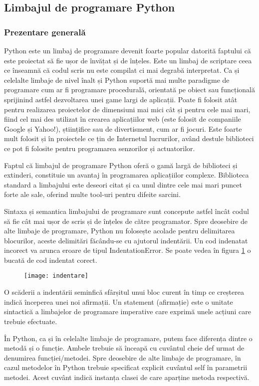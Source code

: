 \documentclass[../IoMusT.tex]{subfiles}
\begin{document}
\subsection{Limbajul de programare Python}
\subsubsection{Prezentare generală}
Python este un limbaj de programare devenit foarte popular datorită faptului că este proiectat să fie ușor de învățat și de înțeles. Este un limbaj de scriptare ceea ce înseamnă că codul scris nu este compilat ci mai degrabă interpretat. Ca și celelalte limbaje de nivel înalt și Python suportă mai multe paradigme de programare cum ar fi programare procedurală, orientată pe obiect sau funcțională sprijinind astfel dezvoltarea unei game largi de aplicații. Poate fi folosit atât pentru realizarea proiectelor de dimensiuni mai mici cât și pentru cele mai mari, fiind cel mai des utilizat în crearea aplicațiilor web (este folosit de companiile Google și Yahoo!), științifice sau de divertisment, cum ar fi jocuri. Este foarte mult folosit și în proiectele ce țin de Internetul lucrurilor, având destule biblioteci ce pot fi folosite pentru programarea senzorilor și actuatorilor.
\\
\par Faptul că limbajul de programare Python oferă o gamă largă de biblioteci și extinderi, constituie un avantaj în programarea aplicațiilor complexe. Biblioteca standard a limbajului este deseori citat și ca unul dintre cele mai mari puncet forte ale sale, oferind multe tool-uri pentru difeite sarcini.
\\
\par Sintaxa și semantica limbajului de programare sunt concepute astfel încât codul să fie cât mai ușor de scris și de înțeles de către programator. Spre deosebire de alte limbaje de programare, Python nu folosește acolade pentru delimitarea blocurilor, aceste delimitări făcându-se cu ajutorul indentării. Un cod indenatat incorect va arunca eroare de tipul IndentationError. Se poate vedea în figura \ref{fig:indent} o bucată de cod indentat corect.
\begin{figure}[h]
\centering
\texttt{[image: indentare]}
\caption{}
\label{fig:indent}
\end{figure}
O scăderii  a indentării  seminfică sfârșitul unui bloc curent în timp ce creșterea indică începerea unei noi afirmații. Un statement (afirmație) este o unitate sintactică a limbajelor de programare imperative care exprimă  unele acțiuni care trebuie efectuate.
\\
\par În Python, ca și în celelalte limbaje de programare, putem face diferența dintre o metodă și o funcție. Ambele trebuie să înceapă cu cuvântul cheie def urmat de denumirea funcției/metodei. Spre deosebire de alte limbaje de programare, în cazul metodelor în Python trebuie specificat explicit cuvântul self în parametrii metodei. Acest cuvânt indică instanța clasei de care aparține metoda respectivă.
\end{document}
